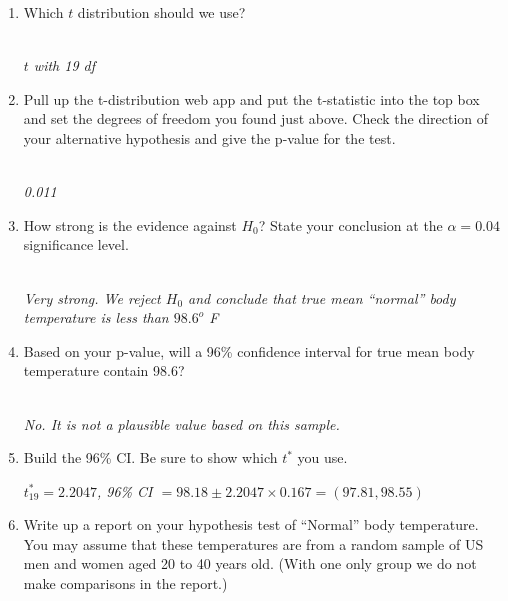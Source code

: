 \begin{enumerate}
\item Which $t$ distribution should we use?
\begin{students}
  \vspace{1cm}
\end{students}
\begin{key}
\\ {\it $t$ with 19 df}
\end{key}



\item Pull up the t-distribution web app and put the t-statistic into
  the top box and set the degrees of freedom you found just
  above. Check the direction of your alternative hypothesis and give
  the p-value for the test.
\begin{students}
  \vspace{1cm}
\end{students}
\begin{key}
\\ {\it 0.011}
\end{key}
\item  How strong is the evidence against $H_0$?  State your
  conclusion at the $\alpha = 0.04$ significance level.
\begin{students}
  \vspace{1cm}
\end{students}
\begin{key}
\\ {\it Very strong. We reject $H_0$ and conclude that true mean
  ``normal'' body temperature is less than $98.6^o$ F}
\end{key}

\item Based on your p-value, will a 96\% confidence interval for true
  mean body temperature contain 98.6?
\begin{students}
  \vspace{1cm}
\end{students}
\begin{key}
\\ {\it No. It is not a plausible value based on this sample.}
\end{key}

\item Build the 96\% CI.  Be sure to show which $t^*$ you use.
\begin{students}
  \vspace{1cm}
\end{students}
\begin{key}
 {\it $t^*_{19} = 2.2047$, 96\% CI $= 98.18 \pm 2.2047 \times 0.167 =
   (97.81, 98.55)$} 
\end{key}

\item Write up a report on  your hypothesis test of ``Normal'' body
  temperature.  You 
  may assume that these temperatures are from a random sample of US
  men and women aged 20 to 40 years old. (With one only group we do not make
  comparisons in the report.)
\begin{students}
  \newpage
\end{students}
\end{enumerate}



